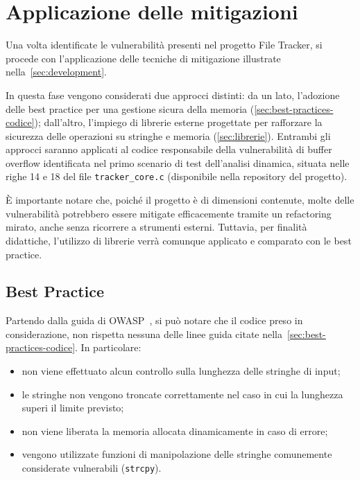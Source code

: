 \section{Applicazione delle mitigazioni}
\label{sec:mitigation_techniques}

Una volta identificate le vulnerabilità presenti nel progetto File Tracker, si
procede con l'applicazione delle tecniche di mitigazione illustrate nella~\autoref{sec:development}.

In questa fase vengono considerati due approcci distinti: da un lato, l'adozione
delle best practice per una gestione sicura della memoria (\autoref{sec:best-practices-codice});
dall'altro, l'impiego di librerie esterne progettate per rafforzare la sicurezza
delle operazioni su stringhe e memoria (\autoref{sec:librerie}). Entrambi gli approcci
saranno applicati al codice responsabile della vulnerabilità di buffer overflow identificata
nel primo scenario di test dell'analisi dinamica, situata nelle righe 14 e 18
del file \texttt{tracker\_core.c} (disponibile nella repository del progetto).

È importante notare che, poiché il progetto è di dimensioni contenute, molte delle
vulnerabilità potrebbero essere mitigate efficacemente tramite un refactoring mirato,
anche senza ricorrere a strumenti esterni. Tuttavia, per finalità didattiche, l'utilizzo
di librerie verrà comunque applicato e comparato con le best practice.

\subsection*{Best Practice}
\label{sec:best-practices-case-study}

Partendo dalla guida di OWASP~\cite{owasp_best_practices}, si può notare che il codice
preso in considerazione, non rispetta nessuna delle linee guida citate nella~\autoref{sec:best-practices-codice}.
In particolare:
\begin{itemize}
  \item non viene effettuato alcun controllo sulla lunghezza delle stringhe di input;

  \item le stringhe non vengono troncate correttamente nel caso in cui la lunghezza
    superi il limite previsto;

  \item non viene liberata la memoria allocata dinamicamente in caso di errore;

  \item vengono utilizzate funzioni di manipolazione delle stringhe comunemente considerate
    vulnerabili (\texttt{strcpy}).
\end{itemize}

